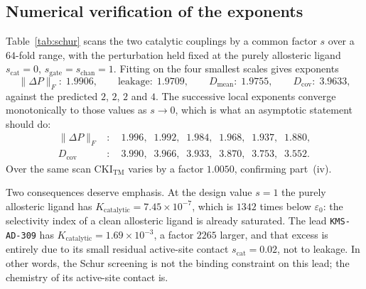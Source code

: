 \documentclass[11pt,reqno]{amsart}
\theoremstyle{plain}
\theoremstyle{definition}
\theoremstyle{remark}
\numberwithin{equation}{section}
\newcommand{\CKI}{\mathrm{CKI}}
\newcommand{\Kcat}{K_{\mathrm{catalytic}}}
\newcommand{\CKItm}{\CKI_{\mathrm{TM}}}
\newcommand{\lead}{\texttt{KMS-AD-309}}
\begin{document}
\subsection{Numerical verification of the exponents}
Table~\ref{tab:schur} scans the two catalytic couplings by a common factor $s$ over a $64$-fold range, with the perturbation held fixed at the purely allosteric ligand $s_{\mathrm{cat}}=0$, $s_{\mathrm{gate}}=s_{\mathrm{chan}}=1$. Fitting on the four smallest scales gives exponents
\[
\|\Delta P\|_F:\;1.9906,\qquad
\text{leakage}:\;1.9709,\qquad
D_{\mathrm{mean}}:\;1.9755,\qquad
D_{\mathrm{cov}}:\;3.9633,
\]
against the predicted $2$, $2$, $2$ and $4$. The successive local exponents converge monotonically to those values as $s\to0$, which is what an asymptotic statement should do:
\begin{align*}
\|\Delta P\|_F &:\quad 1.996,\;\; 1.992,\;\; 1.984,\;\; 1.968,\;\; 1.937,\;\; 1.880,\\
D_{\mathrm{cov}} &:\quad 3.990,\;\; 3.966,\;\; 3.933,\;\; 3.870,\;\; 3.753,\;\; 3.552.
\end{align*}
Over the same scan $\CKItm$ varies by a factor $1.0050$, confirming part~(iv).

Two consequences deserve emphasis. At the design value $s=1$ the purely allosteric ligand has $\Kcat=7.45\times10^{-7}$, which is $1342$ times below $\varepsilon_0$: the selectivity index of a clean allosteric ligand is already saturated. The lead \lead{} has $\Kcat=1.69\times10^{-3}$, a factor $2265$ larger, and that excess is entirely due to its small residual active-site contact $s_{\mathrm{cat}}=0.02$, not to leakage. In other words, the Schur screening is not the binding constraint on this lead; the chemistry of its active-site contact is.
\end{document}
